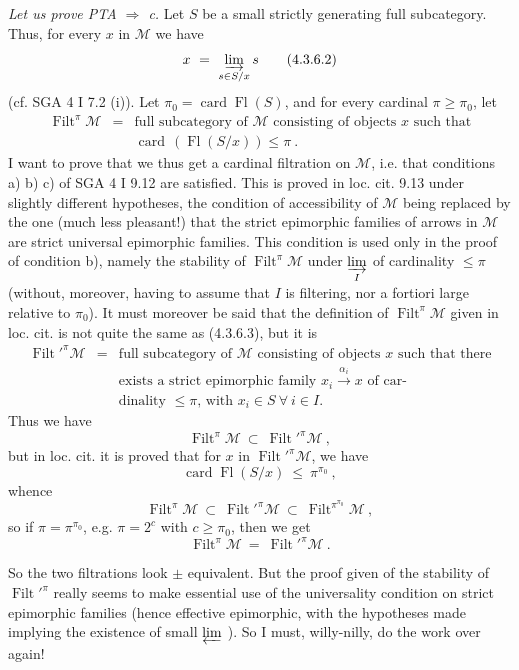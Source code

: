 \documentclass[11pt]{article}
\newcommand{\msp}[1]{\marginpar{\footnotesize [#1]}}
\newcommand{\card}{\operatorname{card}}
\newcommand{\Fl}{\operatorname{Fl}}
\newcommand{\Filt}{\operatorname{Filt}}
\begin{document}
\noindent\textit{Let us prove PTA $\Longrightarrow$ c.} Let $S$ be a small strictly generating full subcategory. Thus, \msp{page 72}for every $x$ in $\mathcal M$ we have
\[
x\ =\ \varinjlim_{s\in S/x}s
\tag*{(4.3.6.2)}
\]
(cf. SGA 4 I 7.2 (i)). Let $\pi_0=\card\Fl(S)$, and for every cardinal $\pi\geqslant\pi_0$, let
\[
\begin{array}{lcl}
\Filt^\pi\mathcal M & = & \text{full subcategory of $\mathcal M$ consisting of objects $x$ such that}\\
 & & \card\,(\Fl(S/x))\leqslant\pi\ .
\end{array}
\tag*{(4.3.6.3)}
\]
I want to prove that we thus get a cardinal filtration on $\mathcal M$, i.e. that conditions a) b) c) of SGA 4 I 9.12 are satisfied. This is proved in loc. cit. 9.13 under slightly different hypotheses, the condition of accessibility of $\mathcal M$ being replaced by the one (much less pleasant!) that the strict epimorphic families of arrows in $\mathcal M$ are strict universal epimorphic families. This condition is used only in the proof of condition b), namely the stability of $\Filt^\pi\mathcal M$ under $\varinjlim\limits_I$ of cardinality $\leqslant\pi$ (without, moreover, having to assume that $I$ is filtering, nor a fortiori large relative to $\pi_0$). It must moreover be said that the definition of $\Filt^\pi\mathcal M$ given in loc. cit. is not quite the same as (4.3.6.3), \msp{page 73}but it is
\[
\begin{array}{lcl}
\Filt'^{\pi}\mathcal M & = & \text{full subcategory of $\mathcal M$ consisting of objects $x$ such that there}\\
 & & \text{exists a strict epimorphic family $x_i\xrightarrow{\alpha_i}x$ of car-}\\
 & & \text{dinality $\leqslant\pi$, with $x_i\in S\ \forall\ i\in I$.}
\end{array}
\tag*{(4.3.6.3$'$)}
\]
Thus we have
\[
\Filt^\pi\mathcal M\ \subset\ \Filt'^{\pi}\mathcal M\ ,
\]
but in loc. cit. it is proved that for $x$ in $\Filt'^{\pi}\mathcal M$, we have
\[
\card\Fl(S/x)\ \leqslant\ \pi^{\pi_0}\ ,
\]
whence
\[
\Filt^\pi\mathcal M\ \subset\ \Filt'^{\pi}\mathcal M\ \subset\ \Filt^{\pi^{\pi_0}}\mathcal M\ ,
\]
so if $\pi=\pi^{\pi_0}$, e.g. $\pi=2^c$ with $c\geqslant\pi_0$, then we get
\[
\Filt^\pi\mathcal M\ =\ \Filt'^{\pi}\mathcal M\ .
\]

\noindent So the two filtrations look $\pm$ equivalent. But the proof given of the stability of $\Filt'^{\pi}$ really seems to make essential use of the universality condition on strict epimorphic families (hence effective epimorphic, with the hypotheses made implying the existence of small $\varprojlim$ ). So I must, willy-nilly, do the work over again! %
\end{document}

